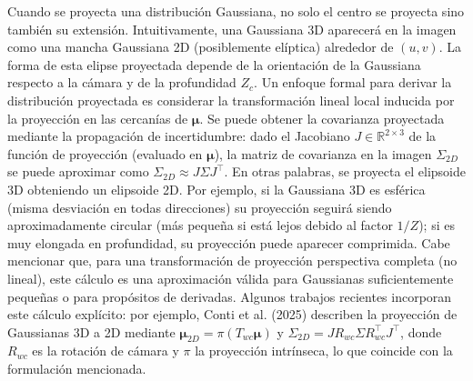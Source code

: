 Cuando se proyecta una distribución Gaussiana, no solo el centro se proyecta sino también su extensión. Intuitivamente, una Gaussiana 3D aparecerá en la 
imagen como una mancha Gaussiana 2D (posiblemente elíptica) alrededor de $(u,v)$. La forma de esta elipse proyectada depende de la orientación de la 
Gaussiana respecto a la cámara y de la profundidad $Z_c$. Un enfoque formal para derivar la distribución proyectada es considerar la transformación 
lineal local inducida por la proyección en las cercanías de $\boldsymbol{\mu}$. Se puede obtener la covarianza proyectada mediante la propagación de 
incertidumbre: dado el Jacobiano $J \in \mathbb{R}^{2\times3}$ de la función de proyección (evaluado en $\boldsymbol{\mu}$), la matriz de covarianza 
en la imagen $\Sigma_{2D}$ se puede aproximar como $\Sigma_{2D} \approx J \Sigma J^\top$. En otras palabras, se proyecta el elipsoide 3D obteniendo 
un elipsoide 2D. Por ejemplo, si la Gaussiana 3D es esférica (misma desviación en todas direcciones) su proyección seguirá siendo aproximadamente 
circular (más pequeña si está lejos debido al factor $1/Z$); si es muy elongada en profundidad, su proyección puede aparecer comprimida. 
Cabe mencionar que, para una transformación de proyección perspectiva completa (no lineal), este cálculo es una aproximación válida para Gaussianas 
suficientemente pequeñas o para propósitos de derivadas. Algunos trabajos recientes incorporan este cálculo explícito: por ejemplo, Conti et al. (2025) 
describen la proyección de Gaussianas 3D a 2D mediante $\boldsymbol{\mu}_{2D} = \pi(T_{wc}\boldsymbol{\mu})$ y $\Sigma_{2D} = J R_{wc}\Sigma R_{wc}^\top J^\top$, 
donde $R_{wc}$ es la rotación de cámara y $\pi$ la proyección intrínseca, lo que coincide con la formulación mencionada.

